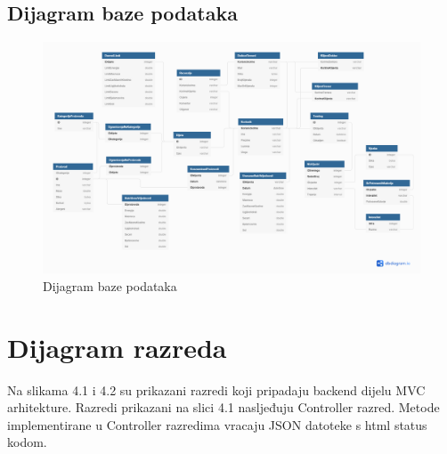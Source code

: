 				\subsection{Dijagram baze podataka}
				\begin{figure}[H]
					\includegraphics[width=\textwidth,height=\textwidth,keepaspectratio]{dijagrami/dijagramBaze.png}
					\centering
					\caption{Dijagram baze podataka}
					\label{fig:promjene}
				\end{figure}
				
				\eject
			
		\section{Dijagram razreda}
		
			Na slikama 4.1 i 4.2 su prikazani razredi koji pripadaju backend dijelu MVC
			arhitekture. Razredi prikazani na slici 4.1 nasljeđuju Controller razred. Metode implementirane u Controller razredima vracaju JSON datoteke s html status kodom. 
			
